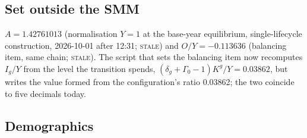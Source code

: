 \documentclass[11pt,a4paper]{article}
\newcommand{\tabdir}{audit_2026-10-01}
\newcommand{\code}[1]{\texttt{#1}}
\newcommand{\stale}{\textcolor{red!70!black}{\textsc{stale}}}
\begin{document}
\subsection{Set outside the SMM}

$A = 1.42761013$ (normalisation $Y = 1$ at the base-year equilibrium, single-lifecycle construction, 2026-10-01 after 12:31; \stale) and $O/Y = -0.113636$ (balancing item, same chain; \stale). The script that sets the balancing item now recomputes $I_g/Y$ from the level the transition spends, $(\delta_g + \Gamma_0 - 1)K^g/Y = 0.03862$, but writes the value formed from the configuration's ratio 0.03862; the two coincide to five decimals today.

\begin{table}[htbp]\centering\footnotesize
\caption{Calibrated parameters against their direct data counterparts. The 22:23 run wrote placeholders (no \code{--implied} flag); the A100 values of 13:41 survive only in \code{step0_report.log}: contribution base$/Y$ 0.6587, contribution rate 0.1974, pension at retirement over last wage 0.5723 against data 0.570, 0.228, 0.763. The first two model values are identities, $1 - \alpha - \mathrm{UI}/Y$ and $\tau^p$; only the replacement row is a simulated statistic.}

\end{table}

\subsection{Demographics}

\begin{table}[htbp]\centering\footnotesize
\caption{Age structure, 2026-10-01 22:23, from the demography file and the transition's population weights; current, no solve involved. Model $t = 0$ reproduces the data by construction of the demography file (Appendix~C, spot checks 1--3).}

\end{table}

\begin{table}[htbp]\centering\footnotesize
\caption{Implied growth rates, written 14:36 on 2026-10-01 by a local baseline run at $n_{sim}$ and configuration not recorded (\stale, provenance unknown). The Level and Per-capita columns are $\Gamma_T - 1$ and $g$ by construction; the detrended-trend column over $t = 156, \dots, 179$ is the flatness test. $B$ is absent because that run tracked no debt.}

\end{table}
\end{document}
